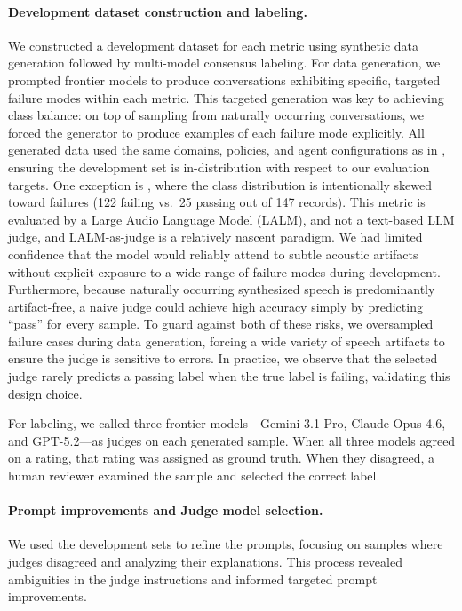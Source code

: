 \paragraph{Development dataset construction and labeling.}
We constructed a development dataset for each metric using synthetic data
generation followed by multi-model consensus labeling. For data
generation, we prompted frontier models to produce conversations
exhibiting specific, targeted failure modes within each metric. This
targeted generation was key to achieving class balance: on top of 
sampling from naturally occurring conversations, we forced the generator to produce examples of each
failure mode explicitly. All generated data used the same domains,
policies, and agent configurations as in \framework, ensuring
the development set is in-distribution with respect to our evaluation
targets. One exception is \metricfidelity, where the class distribution is
intentionally skewed toward failures (122 failing vs.\ 25 passing out of
147 records). This metric is evaluated by a Large Audio Language Model
(LALM), and not a text-based LLM judge, and LALM-as-judge is a
relatively nascent paradigm. We had limited confidence that the model
would reliably attend to subtle acoustic artifacts without explicit
exposure to a wide range of failure modes during development. Furthermore,
because naturally occurring synthesized speech is predominantly
artifact-free, a naive judge could achieve high accuracy simply by
predicting ``pass'' for every sample. To guard against both of these
risks, we oversampled failure cases during data generation, forcing a
wide variety of speech artifacts to ensure the judge is sensitive to
errors. In practice, we observe that the selected judge rarely predicts a
passing label when the true label is failing, validating this design
choice.

For labeling, we called three frontier models---Gemini 3.1 Pro, Claude
Opus 4.6, and GPT-5.2---as judges on each generated sample. When all
three models agreed on a rating, that rating was assigned as ground
truth. When they disagreed, a human reviewer examined the sample and
selected the correct label. 

\paragraph{Prompt improvements and Judge model selection.}
We used the development sets to refine the prompts, focusing on samples where judges disagreed and analyzing their explanations. This process revealed ambiguities in the judge instructions and informed targeted prompt improvements.

